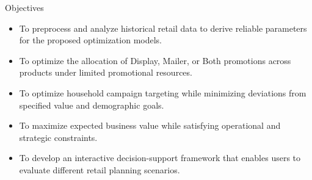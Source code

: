 \documentclass[aspectratio=169,10pt]{beamer}
\begin{document}
\begin{frame}{Objectives}

\vspace{0.35cm}

\begin{itemize}

    \item To preprocess and analyze historical retail data to
    derive reliable parameters for the proposed optimization models.

    \vspace{0.3cm}

    \item To optimize the allocation of Display, Mailer, or Both
    promotions across products under limited promotional resources.

    \vspace{0.3cm}

    \item To optimize household campaign targeting while minimizing
    deviations from specified value and demographic goals.

    \vspace{0.3cm}

    \item To maximize expected business value while satisfying
    operational and strategic constraints.

    \vspace{0.3cm}

    \item To develop an interactive decision-support framework that
    enables users to evaluate different retail planning scenarios.

\end{itemize}

\end{frame}
\end{document}
